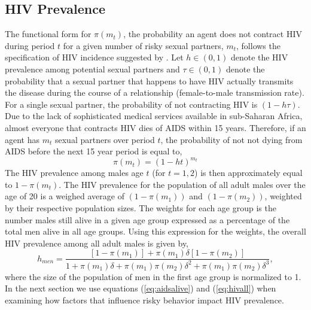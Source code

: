 \documentclass[12pt]{article}
\newcommand{\beq}{\begin{equation}}
\newcommand{\eeq}{\end{equation}}
\newcommand{\citee}[1]{\citet*{#1}}
\begin{document}
\subsection{HIV Prevalence}
The functional form for $\pi(m_t)$, the probability an agent does not contract HIV during period $t$ for a given number of risky sexual partners, $m_t$, follows the specification of HIV incidence suggested by \citee{eoQJE}.  Let $h\in(0,1)$ denote the HIV prevalence among potential sexual partners and $\tau \in (0,1)$ denote the probability that a sexual partner that happens to have HIV actually transmits the disease during the course of a relationship (female-to-male transmission rate).  For a single sexual partner, the probability of not contracting HIV is $(1-h\tau)$.  Due to the lack of sophisticated medical services available in sub-Saharan Africa, almost everyone that contracts HIV dies of AIDS within 15 years.  Therefore, if an agent has $m_t$ sexual partners over period $t$, the probability of not not dying from AIDS before the next 15 year period is equal to,
\beq \label{eq:aidsalive} \pi(m_t) = (1-ht)^{m_t} \eeq
The HIV prevalence among males age $t$ (for $t=1,2$) is then approximately equal to $1-\pi(m_t)$.  The HIV prevalence for the population of all adult males over the age of 20 is a weighed average of $(1-\pi(m_1))$ and $(1-\pi(m_2))$, weighted by their respective population sizes.  The weights for each age group is the number males still alive in a given age group expressed as a percentage of the total men alive in all age groups.  Using this expression for the weights, the overall HIV prevalence among all adult males is given by,
\beq \label{eq:hivall} h_{men} = \frac{\left[1-\pi(m_1)\right] + \pi(m_1)\delta\left[1-\pi(m_2)\right]}{1 + \pi(m_1)\delta + \pi(m_1)\pi(m_2)\delta^2 + \pi(m_1)\pi(m_2)\delta^3}, \eeq
where the size of the population of men in the first age group is normalized to 1.  In the next section we use equations (\ref{eq:aidsalive}) and (\ref{eq:hivall}) when examining how factors that influence risky behavior impact HIV prevalence.
\end{document}
